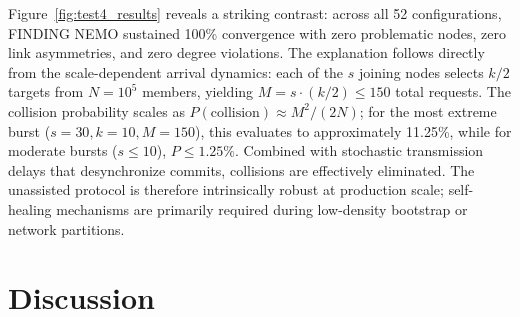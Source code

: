\documentclass[runningheads]{llncs}
\begin{document}
Figure~\ref{fig:test4_results} reveals a striking contrast: across all 52 configurations, FINDING NEMO sustained 100\% convergence with zero problematic nodes, zero link asymmetries, and zero degree violations. The explanation follows directly from the scale-dependent arrival dynamics: each of the $s$ joining nodes selects $k/2$ targets from $N = 10^5$ members, yielding $M = s \cdot (k/2) \le 150$ total requests. The collision probability scales as $P(\text{collision}) \approx M^2 / (2N)$; for the most extreme burst ($s = 30, k = 10, M = 150$), this evaluates to approximately 11.25\%, while for moderate bursts ($s \le 10$), $P \le 1.25\%$. Combined with stochastic transmission delays that desynchronize commits, collisions are effectively eliminated. The unassisted protocol is therefore intrinsically robust at production scale; self-healing mechanisms are primarily required during low-density bootstrap or network partitions.


\section{Discussion}
\label{sec:discussion}


\end{document}
